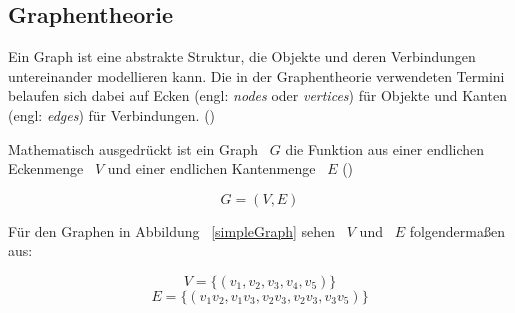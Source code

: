 \documentclass[12pt,a4paper]{article}
\begin{document}
\subsection{Graphentheorie}

Ein Graph ist eine abstrakte Struktur, die Objekte und deren Verbindungen untereinander modellieren kann. Die in der Graphentheorie verwendeten Termini belaufen sich dabei auf Ecken (engl: \textit{nodes} oder \textit{vertices}) für Objekte und Kanten (engl: \textit{edges}) für Verbindungen.
(\cite[49]{kurt})

Mathematisch ausgedrückt ist ein Graph ~$G$ die Funktion aus einer endlichen Eckenmenge ~$V$ und einer endlichen Kantenmenge ~$E$ (\cite[4]{theory})

	$$G = (V,E)$$

Für den Graphen in Abbildung ~\ref{simpleGraph} sehen ~$V$ und ~$E$ folgendermaßen aus:

$$V = \{(v_{1},v_{2},v_{3},v_{4},v_{5})\} $$
$$E = \{(v_{1}v_{2},v_{1}v_{3},v_{2}v_{3},v_{2}v_{3},v_{3}v_{5})\} $$
\end{document}
